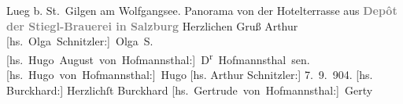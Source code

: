 \begin{ledgroupsized}[t]{13cm}
{{                        Lueg b. St. Gilgen am Wolfgangsee. Panorama von der Hotelterrasse
                     aus}}\pend
           \pstart
           \noindent{}\centering{}\textcolor{gray}{\textbf{Depôt der Stiegl-Brauerei
                     in Salzburg}}\pend
           \pstart
           Herzlichen Gruß \spacefill\mbox{Arthur}\pend
           \pstart
           \spacefill\mbox{{[}hs. Olga Schnitzler:{]} Olga S.}\pend
           \pstart
           \spacefill\mbox{{[}hs. Hugo August von Hofmannsthal:{]} D\textsuperscript{r}{ }Hofmannsthal sen.}\pend
           \pstart
           \spacefill\mbox{{[}hs. Hugo von Hofmannsthal:{]} Hugo}\pend
           \pstart
           {[}hs. Arthur Schnitzler:{]} 7. 9. 904.\pend
           \pstart
           {[}hs. Burckhard:{]} Herzlichſt \spacefill\mbox{Burckhard}\pend
           \pstart
           \spacefill\mbox{{[}hs. Gertrude von Hofmannsthal:{]} Gerty}\pend
           
         
         \endnumbering{}\end{ledgroupsized}  \newcommand{\dateiname}{L01438}\newcommand{\titel}{Arthur Schnitzler u. a. an Hermann Bahr, 7. 9. 1904}\newcommand{\editorInnen}{ Kurt Ifkovits,  Martin Anton Müller}
      